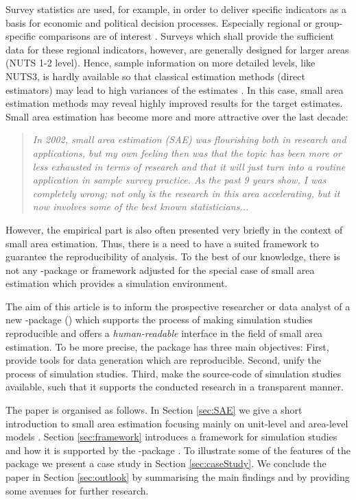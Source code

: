 \documentclass[article]{ajs}
\begin{document}
Survey statistics are used, for example, in order to deliver specific indicators as a basis for economic and political decision processes. Especially regional or group-specific comparisons are of interest \citep[cf.][]{Sch13}. Surveys which shall provide the sufficient data for these regional indicators, however, are generally designed for larger areas (NUTS 1-2 level). Hence, sample information on more detailed levels, like NUTS3, is hardly available so that classical estimation methods (direct estimators) may lead to high variances of the estimates \citep[cf.][]{Gho94}. In this case, small area estimation methods may reveal highly improved results for the target estimates. Small area estimation has become more and more attractive over the last decade: 

\begin{quote}
\textit{In 2002, small area estimation (SAE) was flourishing both in research and applications, but my own feeling then was that the topic has been more or less exhausted in terms of research and that it will just turn into a routine application in sample survey practice. As the past 9 years show, I was completely wrong; not only is the research in this area accelerating, but it now involves some of the best known statisticians...} \cite{pfeffermann13} 
\end{quote} 

However, the empirical part is also often presented very briefly in the context of small area estimation. Thus, there is a need to have a suited framework to guarantee the reproducibility of analysis. To the best of our knowledge, there is not any -package or framework adjusted for the special case of small area estimation which provides a simulation environment.

The aim of this article is to inform the prospective researcher or data analyst of a new -package () which supports the process of making simulation studies reproducible and offers a \textit{human-readable} interface in the field of small area estimation. To be more precise, the package has three main objectives: First, provide tools for data generation which are reproducible. Second, unify the process of simulation studies. Third, make the source-code of simulation studies available, such that it supports the conducted research in a transparent manner.

The paper is organised as follows. In Section \ref{sec:SAE} we give a short introduction to small area estimation focusing mainly on unit-level \citep{battese88} and area-level models \citep{fay79}. Section \ref{sec:framework} introduces a framework for simulation studies and how it is supported by the  -package . To illustrate some of the features of the package we present a case study in Section \ref{sec:caseStudy}. We conclude the paper in Section \ref{sec:outlook} by summarising the main findings and by providing some avenues for further research.
\end{document}
